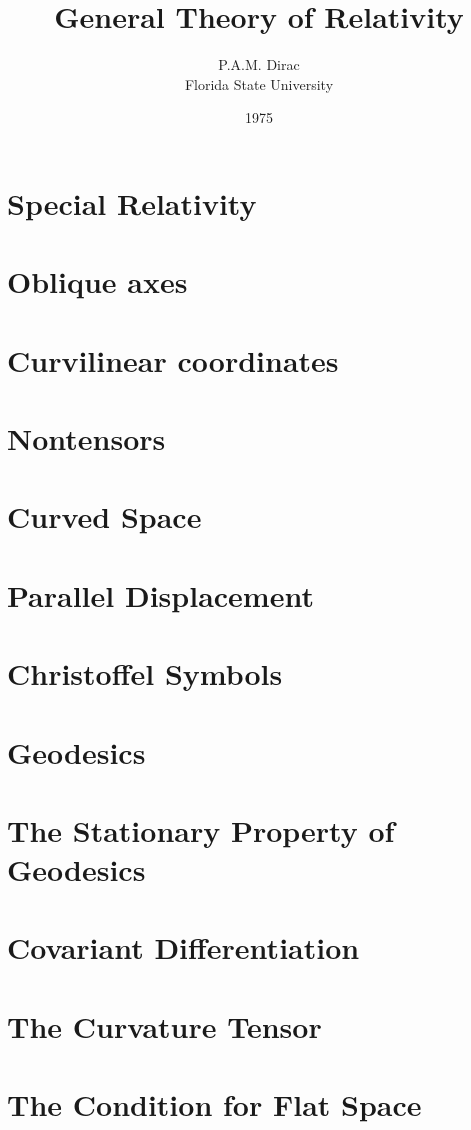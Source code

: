 \documentclass[10pt]{article}
\title{General Theory of Relativity}
\author{P.A.M. Dirac\\Florida State University}
\date{1975}
\begin{document}
\maketitle
\section{Special Relativity}

\section{Oblique axes}

\section{Curvilinear coordinates}

\section{Nontensors}

\section{Curved Space}

\section{Parallel Displacement}

\section{Christoffel Symbols}

\section{Geodesics}

\section{The Stationary Property of Geodesics}

\section{Covariant Differentiation}

\section{The Curvature Tensor}

\section{The Condition for Flat Space}

\end{document}
